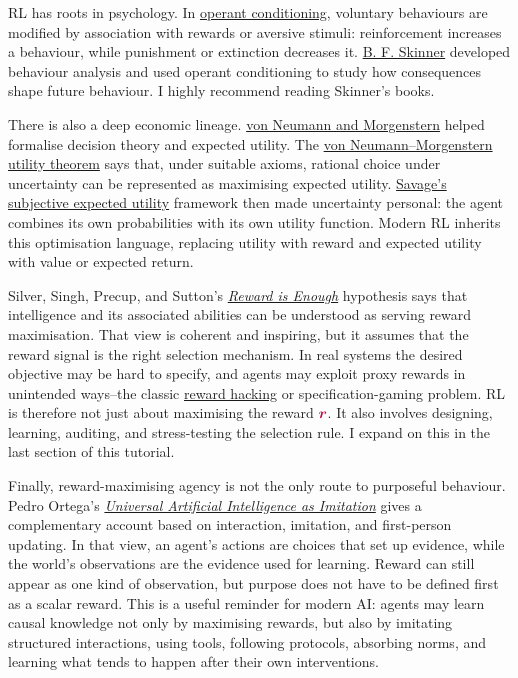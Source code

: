 \documentclass{article}
\newcommand{\colsym}[2]{\ensuremath{\textcolor{#1}{\boldsymbol{#2}}}}
\newcommand{\reward}{\colsym{purple}{r}}
\begin{document}
RL has roots in psychology. In \href{https://en.wikipedia.org/wiki/Operant_conditioning}{operant conditioning}, voluntary behaviours are modified by association with rewards or aversive stimuli: reinforcement increases a behaviour, while punishment or extinction decreases it. \href{https://en.wikipedia.org/wiki/B._F._Skinner}{B. F. Skinner} developed behaviour analysis and used operant conditioning to study how consequences shape future behaviour. I highly recommend reading Skinner's books.

There is also a deep economic lineage. \href{https://en.wikipedia.org/wiki/Theory_of_Games_and_Economic_Behavior}{von Neumann and Morgenstern} helped formalise decision theory and expected utility. The \href{https://en.wikipedia.org/wiki/Von_Neumann\%E2\%80\%93Morgenstern_utility_theorem}{von Neumann--Morgenstern utility theorem} says that, under suitable axioms, rational choice under uncertainty can be represented as maximising expected utility. \href{https://en.wikipedia.org/wiki/Subjective_expected_utility}{Savage's subjective expected utility} framework then made uncertainty personal: the agent combines its own probabilities with its own utility function. Modern RL inherits this optimisation language, replacing utility with reward and expected utility with value or expected return.


Silver, Singh, Precup, and Sutton's \href{https://www.sciencedirect.com/science/article/pii/S0004370221000862}{\emph{Reward is Enough}} hypothesis says that intelligence and its associated abilities can be understood as serving reward maximisation. That view is coherent and inspiring, but it assumes that the reward signal is the right selection mechanism. In real systems the desired objective may be hard to specify, and agents may exploit proxy rewards in unintended ways--the classic \href{https://en.wikipedia.org/wiki/Reward_hacking}{reward hacking} or specification-gaming problem. RL is therefore not just about maximising the reward \reward{}. It also involves designing, learning, auditing, and stress-testing the selection rule. I expand on this in the last section of this tutorial.


Finally, reward-maximising agency is not the only route to purposeful behaviour. Pedro Ortega's \href{https://adaptiveagents.org/universal_ai_as_imitation}{\emph{Universal Artificial Intelligence as Imitation}} gives a complementary account based on interaction, imitation, and first-person updating. In that view, an agent's actions are choices that set up evidence, while the world's observations are the evidence used for learning. Reward can still appear as one kind of observation, but purpose does not have to be defined first as a scalar reward. This is a useful reminder for modern AI: agents may learn causal knowledge not only by maximising rewards, but also by imitating structured interactions, using tools, following protocols, absorbing norms, and learning what tends to happen after their own interventions.
\end{document}

